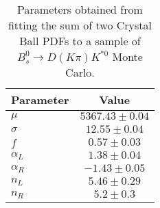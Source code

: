 \begin{table}[h]
  \centering
  \begin{tabular}{lc}
      \toprule
      Parameter & Value \\
      \midrule
      $\mu$ & $5367.43 \pm 0.04$ \\
      $\sigma$ & $12.55 \pm 0.04$ \\
      $f$ & $0.57 \pm 0.03$ \\
      $\alpha_L$ & $1.38 \pm 0.04$ \\
      $\alpha_R$ & $-1.43 \pm 0.05$ \\
      $n_L$ & $5.46 \pm 0.29$ \\
      $n_R$ & $5.2 \pm 0.3$ \\
  \bottomrule
  \end{tabular}
  \caption{Parameters obtained from fitting the sum of two Crystal Ball PDFs to a sample of $B^0_s \to D(K\pi)K^{*0}$ Monte Carlo.}
\label{tab:signal_Bs_MC_params}
\end{table}
